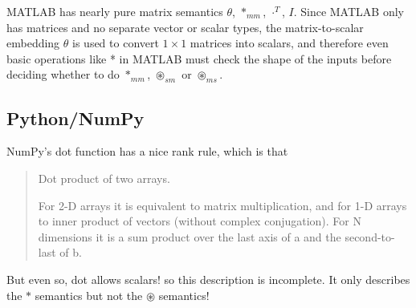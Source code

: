 MATLAB has nearly pure matrix semantics $\theta$, $*_{mm}$, $\cdot^{T}$,
$I$. Since MATLAB only has matrices and no separate vector or scalar
types, the matrix-to-scalar embedding $\theta$ is used to convert
$1\times1$ matrices into scalars, and therefore even basic operations
like {*} in MATLAB must check the shape of the inputs before deciding
whether to do $*_{mm}$, $\circledast_{sm}$ or $\circledast_{ms}$.

\subsection{Python/NumPy}

NumPy's dot function has a nice rank rule, which is that
\begin{quotation}
Dot product of two arrays.

For 2-D arrays it is equivalent to matrix multiplication, and for
1-D arrays to inner product of vectors (without complex conjugation).
For N dimensions it is a sum product over the last axis of a and the
second-to-last of b. \cite{numpy.dot}
\end{quotation}
But even so, dot allows scalars! so this description is incomplete.
It only describes the $*$ semantics but not the $\circledast$ semantics!

